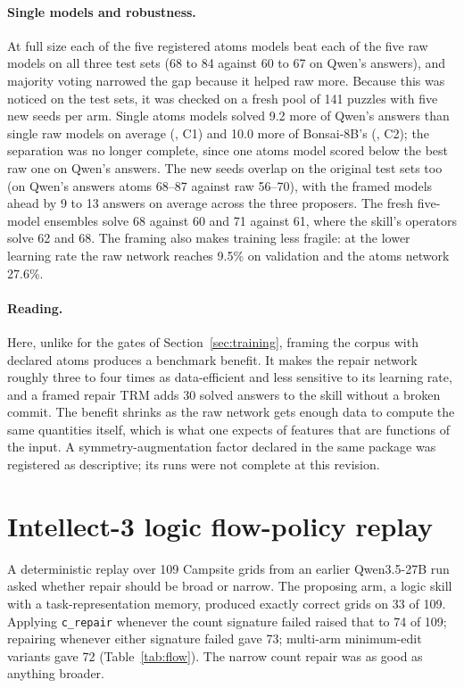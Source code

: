 \documentclass[11pt]{article}
\begin{document}
\paragraph{Single models and robustness.} At full size each of the five registered atoms models beat each of the five raw models on all three test sets (68 to 84 against 60 to 67 on Qwen's answers), and majority voting narrowed the gap because it helped raw more. Because this was noticed on the test sets, it was checked on a fresh pool of 141 puzzles with five new seeds per arm. Single atoms models solved 9.2 more of Qwen's answers than single raw models on average (\testCone, C1) and 10.0 more of Bonsai-8B's (\testCtwo, C2); the separation was no longer complete, since one atoms model scored below the best raw one on Qwen's answers. The new seeds overlap on the original test sets too (on Qwen's answers atoms 68--87 against raw 56--70), with the framed models ahead by 9 to 13 answers on average across the three proposers. The fresh five-model ensembles solve 68 against 60 and 71 against 61, where the skill's operators solve 62 and 68. The framing also makes training less fragile: at the lower learning rate the raw network reaches 9.5\% on validation and the atoms network 27.6\%.

\paragraph{Reading.} Here, unlike for the gates of Section~\ref{sec:training}, framing the corpus with declared atoms produces a benchmark benefit. It makes the repair network roughly three to four times as data-efficient and less sensitive to its learning rate, and a framed repair TRM adds 30 solved answers to the skill without a broken commit. The benefit shrinks as the raw network gets enough data to compute the same quantities itself, which is what one expects of features that are functions of the input. A symmetry-augmentation factor declared in the same package was registered as descriptive; its runs were not complete at this revision.

\section{Intellect-3 logic flow-policy replay}
\label{sec:flow}

A deterministic replay over 109 Campsite grids from an earlier Qwen3.5-27B run asked whether repair should be broad or narrow. The proposing arm, a logic skill with a task-representation memory, produced exactly correct grids on 33 of 109. Applying \texttt{c\_repair} whenever the count signature failed raised that to 74 of 109; repairing whenever either signature failed gave 73; multi-arm minimum-edit variants gave 72 (Table~\ref{tab:flow}). The narrow count repair was as good as anything broader.
\end{document}
